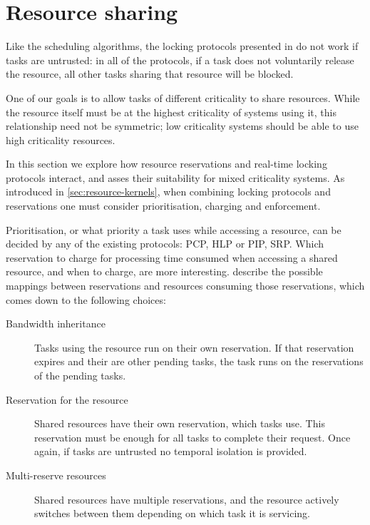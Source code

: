 \section{Resource sharing}

Like the scheduling algorithms, the locking protocols presented in
 do not work if tasks are untrusted: in all of the protocols, if a
task does not voluntarily release the resource, all other tasks sharing that resource will be
blocked.

One of our goals is to allow tasks of different criticality to share resources.  While the resource
itself must be at the highest criticality of systems using it, this relationship need not be
symmetric; low criticality systems should be able to use high criticality resources.

In this section we explore how resource reservations and real-time locking protocols interact, and
asses their suitability for mixed criticality systems.  As introduced in
\cref{sec:resource-kernels}, when combining locking protocols and reservations one must consider
prioritisation, charging and enforcement.

Prioritisation, or what priority a task uses while accessing a resource, can be decided by any of
the existing protocols: \gls{PCP}, \gls{HLP} or \gls{PIP}, \gls{SRP}. Which reservation to charge 
for processing time consumed when accessing a shared resource, and when to charge, are more
interesting. \citet{deNiz_LSR_01} describe the possible mappings
between reservations and resources consuming those reservations, which comes down to the following
choices:

\begin{description}
\item[Bandwidth inheritance] Tasks using the resource run on their own reservation.  If that
    reservation expires and their are other pending tasks, the task runs on the reservations of the
    pending tasks. 
\item[Reservation for the resource] Shared resources have their own reservation, which tasks use.
    This reservation must be enough for all tasks to complete their request.  Once again, if tasks
    are untrusted no temporal isolation is provided. 
\item[Multi-reserve resources] Shared resources have multiple reservations, and the resource
    actively switches between them depending on which task it is servicing. 
\end{description} 

